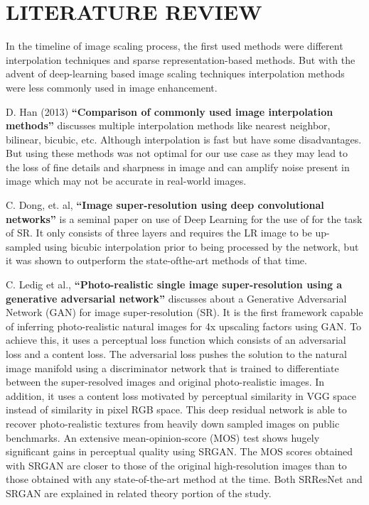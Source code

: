\newpage
\section{LITERATURE REVIEW}
In the timeline of image scaling process, the first used methods were different interpolation techniques and sparse representation-based methods. But with the advent
of deep-learning based image scaling techniques interpolation methods were less commonly used in image enhancement.

D. Han (2013) {\bf“Comparison of commonly used image interpolation methods”} discusses multiple interpolation methods like nearest neighbor, bilinear, bicubic, etc. Although interpolation is fast but have some disadvantages. But using these methods was not optimal for our use case as they may lead to the loss of fine details and sharpness in image and can amplify noise present in image which may not be accurate in real-world images.\cite{r1}

C. Dong, et. al, {\bf“Image super-resolution using deep convolutional networks”} is a seminal paper on use of Deep Learning for the use of for the task of SR. It only consists of three layers and requires the LR image to be up-sampled using bicubic interpolation prior to being processed by the network, but it was shown to outperform the state-ofthe-art methods of that time.\cite{r2}

C. Ledig et al., {\bf“Photo-realistic single image super-resolution using a generative adversarial network”} discusses about a Generative Adversarial Network (GAN) for image super-resolution (SR). It is the first framework capable of inferring photo-realistic natural images for 4x upscaling factors using GAN. To achieve this, it uses
a perceptual loss function which consists of an adversarial loss and a content loss. The adversarial loss pushes the solution to the natural image manifold using a discriminator
network that is trained to differentiate between the super-resolved images and original photo-realistic images. In addition, it uses a content loss motivated by perceptual
similarity in VGG space instead of similarity in pixel RGB space. This deep residual network is able to recover photo-realistic textures from heavily down sampled images on public
benchmarks. An extensive mean-opinion-score (MOS) test shows hugely significant gains in perceptual quality using SRGAN. The MOS scores obtained with SRGAN are
closer to those of the original high-resolution images than to those obtained with any state-of-the-art method at the time. Both SRResNet and SRGAN are explained in related theory portion of the study.\cite{r3}
